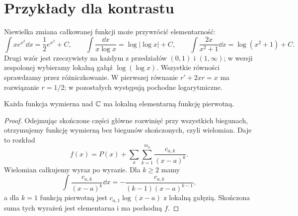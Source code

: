 \section{Przykłady dla kontrastu}

Niewielka zmiana całkowanej funkcji może przywrócić elementarność:
\[
\int x e^{x^2}\dd x=\frac12e^{x^2}+C,\qquad
\int\frac{\dd x}{x\log x}=\log|\log x|+C,
\qquad
\int\frac{2x}{x^2+1}\dd x=\log(x^2+1)+C.
\]
Drugi wzór jest rzeczywisty na każdym z przedziałów $(0,1)$ i $(1,\infty)$; w wersji zespolonej wybieramy lokalną gałąź $\log(\log x)$. Wszystkie równości sprawdzamy przez różniczkowanie. W pierwszej równanie $r'+2xr=x$ ma rozwiązanie $r=1/2$; w pozostałych występują pochodne logarytmiczne.

\begin{twierdzenie}
Każda funkcja wymierna nad $\mathbb{C}$ ma lokalną elementarną funkcję pierwotną.
\end{twierdzenie}
\begin{proof}
Odejmując skończone części główne rozwinięć przy wszystkich biegunach, otrzymujemy funkcję wymierną bez biegunów skończonych, czyli wielomian. Daje to rozkład
\[
f(x)=P(x)+\sum_a\sum_{k=1}^{m_a}\frac{c_{a,k}}{(x-a)^k}.
\]
Wielomian całkujemy wyraz po wyrazie. Dla $k\ge2$ mamy
\[
\int\frac{c_{a,k}}{(x-a)^k}\dd x
=-\frac{c_{a,k}}{(k-1)(x-a)^{k-1}},
\]
a dla $k=1$ funkcją pierwotną jest $c_{a,1}\log(x-a)$ z lokalną gałęzią. Skończona suma tych wyrażeń jest elementarna i ma pochodną $f$.
\end{proof}


